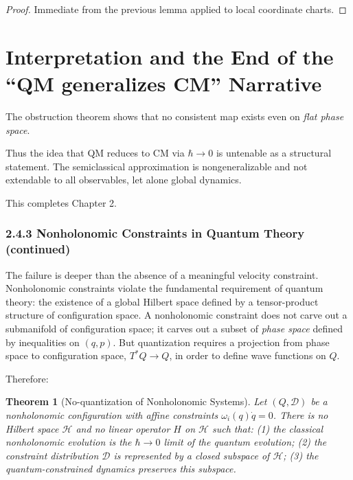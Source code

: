 \documentclass[12pt,oneside]{book}
\theoremstyle{plain}
\newtheorem{theorem}{Theorem}[chapter]
\theoremstyle{definition}
\begin{document}
\begin{proof}
Immediate from the previous lemma applied to local coordinate charts.
\end{proof}

\section{Interpretation and the End of the “QM generalizes CM” Narrative}

The obstruction theorem shows that no consistent map exists even on \emph{flat phase space}.

Thus the idea that QM reduces to CM via $\hbar\to 0$ is untenable as a structural statement.
The semiclassical approximation is nongeneralizable and not extendable to all observables, let alone global dynamics.

This completes Chapter 2.

\subsubsection*{2.4.3 Nonholonomic Constraints in Quantum Theory (continued)}

The failure is deeper than the absence of a meaningful velocity constraint.  
Nonholonomic constraints violate the fundamental requirement of quantum theory:  
the existence of a global Hilbert space defined by a tensor-product structure of configuration space.  
A nonholonomic constraint does not carve out a submanifold of configuration space; it carves out a 
subset of {\em phase space} defined by inequalities on $(q,p)$.  
But quantization requires a projection from phase space to configuration space, $T^*Q \to Q$, in order to define wave functions on $Q$.

Therefore:

\begin{theorem}[No-quantization of Nonholonomic Systems]
Let $(Q,\mathcal{D})$ be a nonholonomic configuration with affine constraints $\omega_i(q)\dot{q} = 0$.  
There is no Hilbert space $\mathcal{H}$ and no linear operator $H$ on $\mathcal{H}$ such that:
(1) the classical nonholonomic evolution is the $\hbar\to 0$ limit of the quantum evolution;
(2) the constraint distribution $\mathcal{D}$ is represented by a closed subspace of $\mathcal{H}$;
(3) the quantum-constrained dynamics preserves this subspace.
\end{theorem}
\end{document}

